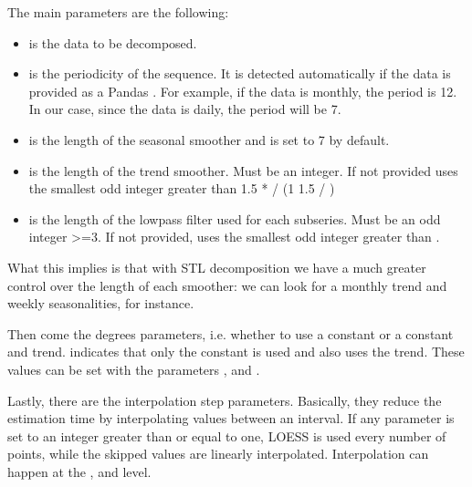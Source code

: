 \documentclass[letterpaper,10pt,english]{jupyterBook}
\begin{document}
\sphinxAtStartPar
The main parameters are the following:
\begin{itemize}
\item {} 
\sphinxAtStartPar
{} is the data to be decomposed.

\item {} 
\sphinxAtStartPar
{} is the periodicity of the sequence. It is detected automatically if the data is provided as a Pandas . For example, if the data is monthly, the period is 12. In our case, since the data is daily, the period will be 7.

\item {} 
\sphinxAtStartPar
{} is the length of the seasonal smoother and is set to 7 by default.

\item {} 
\sphinxAtStartPar
{} is the length of the trend smoother. Must be an  integer. If not provided uses the smallest odd integer greater than 1.5 *  / (1 \sphinxhyphen{} 1.5 / )

\item {} 
\sphinxAtStartPar
{} is the length of the low\sphinxhyphen{}pass filter used for each subseries. Must be an odd integer >=3. If not provided, uses the smallest odd integer greater than .

\end{itemize}

\sphinxAtStartPar
What this implies is that with STL decomposition we have a much greater control over the length of each smoother: we can look for a monthly trend and weekly seasonalities, for instance.

\sphinxAtStartPar
Then come the degrees parameters, i.e. whether to use a constant or a constant and trend.  indicates that only the constant is used and  also uses the trend. These values can be set with the parameters ,  and .

\sphinxAtStartPar
Lastly, there are the interpolation step parameters. Basically, they reduce the estimation time by interpolating values between an interval. If any  parameter is set to an integer greater than or equal to one, LOESS is used every number of points, while the skipped values are linearly interpolated. Interpolation can happen at the ,  and  level.
\end{document}
